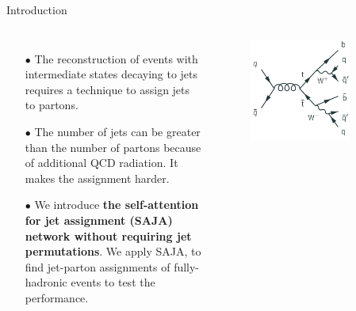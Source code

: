 \begin{frame}[fragile]{Introduction}
\begin{columns}
    \begin{itemize}
      \item[$\bullet$] The reconstruction of events with intermediate states 
                       decaying to jets requires a technique to assign jets to partons.
      \item[$\bullet$] The number of jets can be greater than the number of 
                       partons because of additional QCD radiation. It makes the assignment harder.
      \item[$\bullet$] We introduce {\bfseries the self-attention for jet
                       assignment (SAJA) network without requiring jet permutations}.
                       We apply SAJA, to find jet-parton assignments of
                       fully-hadronic \ttbar events to test the performance.
    \end{itemize}
    \begin{figure}[htpb]
      \centering
      \includegraphics[width=0.8\textwidth]{fig/ttbar.png}
    \end{figure}
\end{columns}
\end{frame}

